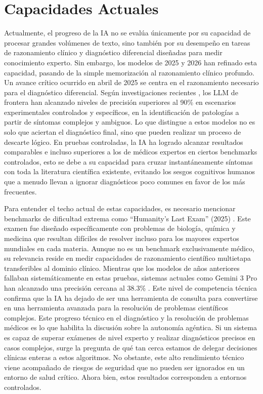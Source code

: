 \documentclass[10pt,a4paper]{article}
\begin{document}
\section{Capacidades Actuales}
Actualmente, el progreso de la IA no se evalúa únicamente por su capacidad de procesar grandes volúmenes de texto, sino también por su desempeño en tareas de razonamiento clínico y diagnóstico diferencial diseñadas para medir conocimiento experto. Sin embargo, los modelos de 2025 y 2026 han refinado esta capacidad, pasando de la simple memorización al razonamiento clínico profundo. Un avance crítico ocurrido en abril de 2025 se centra en el razonamiento necesario para el diagnóstico diferencial. Según investigaciones recientes \cite{differential}, los LLM de frontera han alcanzado niveles de precisión superiores al 90\% en escenarios experimentales controlados y específicos, en la identificación de patologías a partir de síntomas complejos y ambiguos. Lo que distingue a estos modelos no es solo que aciertan el diagnóstico final, sino que pueden realizar un proceso de descarte lógico. En pruebas controladas, la IA ha logrado alcanzar resultados comparables e incluso superiores a los de médicos expertos en ciertos benchmarks controlados, esto se debe a su capacidad para cruzar instantáneamente síntomas con toda la literatura científica existente, evitando los sesgos cognitivos humanos que a menudo llevan a ignorar diagnósticos poco comunes en favor de los más frecuentes.

Para entender el techo actual de estas capacidades, es necesario mencionar benchmarks de dificultad extrema como ``Humanity's Last Exam'' (2025) \cite{humanity}. Este examen fue diseñado específicamente con problemas de biología, química y medicina que resultan difíciles de resolver incluso para los mayores expertos mundiales en cada materia. Aunque no es un benchmark exclusivamente médico, su relevancia reside en medir capacidades de razonamiento científico multietapa transferibles al dominio clínico. Mientras que los modelos de años anteriores fallaban sistemáticamente en estas pruebas, sistemas actuales como Gemini 3 Pro han alcanzado una precisión cercana al 38.3\% \cite{humanityweb}. Este nivel de competencia técnica confirma que la IA ha dejado de ser una herramienta de consulta para convertirse en una herramienta avanzada para la resolución de problemas científicos complejos. Este progreso técnico en el diagnóstico y la resolución de problemas médicos es lo que habilita la discusión sobre la autonomía agéntica. Si un sistema es capaz de superar exámenes de nivel experto y realizar diagnósticos precisos en casos complejos, surge la pregunta de qué tan cerca estamos de delegar decisiones clínicas enteras a estos algoritmos. No obstante, este alto rendimiento técnico viene acompañado de riesgos de seguridad que no pueden ser ignorados en un entorno de salud crítico. Ahora bien, estos resultados corresponden a entornos controlados. 
\end{document}

